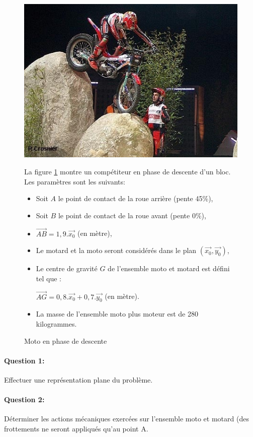 \begin{figure}[!h]
\begin{minipage}{0.48\linewidth}
 \centering\includegraphics[width=0.7\linewidth]{img/Trial_des.jpg}
 \caption{Moto en phase de descente}
  \label{img2}
\end{minipage}
\hfill
\begin{minipage}{0.48\linewidth}
 La figure \ref{img2} montre un compétiteur en phase de descente d'un bloc. Les paramètres sont les suivants:
 \begin{itemize}
  \item Soit $A$ le point de contact de la roue arrière (pente 45\%),
  \item Soit $B$ le point de contact de la roue avant (pente 0\%),
  \item $\overrightarrow{AB}=1,9.\overrightarrow{x_0}$ (en mètre),
  \item Le motard et la moto seront considérés dans le plan $(\overrightarrow{x_0},\overrightarrow{y_0})$,
  \item Le centre de gravité $G$ de l'ensemble moto et motard est défini tel que :
  
  $\overrightarrow{AG}=0,8.\overrightarrow{x_0}+0,7.\overrightarrow{y_0}$ (en mètre).
  \item La masse de l'ensemble moto plus moteur est de 280 kilogrammes.
 \end{itemize}
\end{minipage}
\end{figure}

\paragraph{Question 1:} Effectuer une représentation plane du problème.

\paragraph{Question 2:} Déterminer les actions mécaniques exercées sur l'ensemble moto et motard (des frottements ne seront appliqués qu'au point A.

